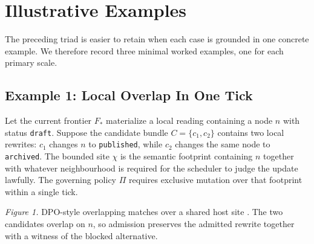 \documentclass[11pt]{article}
\theoremstyle{definition}
\theoremstyle{plain}
\theoremstyle{remark}
\begin{document}
\section{Illustrative Examples}

The preceding triad is easier to retain when each case is grounded in one concrete example. We therefore record three minimal worked examples, one for each primary scale.

\subsection{Example 1: Local Overlap In One Tick}

Let the current frontier \(F_*\) materialize a local reading containing a node \(n\) with status \texttt{draft}. Suppose the candidate bundle \(C = \{c_1, c_2\}\) contains two local rewrites: \(c_1\) changes \(n\) to \texttt{published}, while \(c_2\) changes the same node to \texttt{archived}. The bounded site \(\chi\) is the semantic footprint containing \(n\) together with whatever neighbourhood is required for the scheduler to judge the update lawfully. The governing policy \(\Pi\) requires exclusive mutation over that footprint within a single tick.

\begin{center}

\smallskip
\emph{Figure 1.} DPO-style overlapping matches over a shared host site \cite{ehrig1973graph,corradini1997algebraic}. The two candidates overlap on \(n\), so admission preserves the admitted rewrite together with a witness of the blocked alternative.
\end{center}
\end{document}
